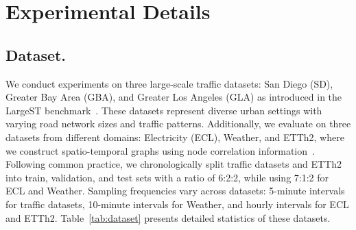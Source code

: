 \appendix

\section{Experimental Details}
\label{appx:exp}

\subsection{Dataset.}
\label{appx:data}
We conduct experiments on three large-scale traffic datasets: San Diego (SD), Greater Bay Area (GBA), and Greater Los Angeles (GLA) as introduced in the LargeST benchmark~\cite{liu2023largest}. These datasets represent diverse urban settings with varying road network sizes and traffic patterns. 
Additionally, we evaluate on three datasets from different domains: Electricity (ECL), Weather, and ETTh2, where we construct spatio-temporal graphs using node correlation information~\cite{kim2022reversible,wu2021autoformer}.
Following common practice, we chronologically split traffic datasets and ETTh2 into train, validation, and test sets with a ratio of 6:2:2, while using 7:1:2 for ECL and Weather. Sampling frequencies vary across datasets: 5-minute intervals for traffic datasets, 10-minute intervals for Weather, and hourly intervals for ECL and ETTh2.
Table~\ref{tab:dataset} presents detailed statistics of these datasets.


